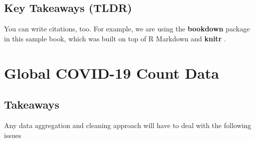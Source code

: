 \documentclass[
]{book}
\begin{document}
\hypertarget{key-takeaways-tldr}{%
\section{Key Takeaways (TLDR)}\label{key-takeaways-tldr}}

You can write citations, too. For example, we are using the \textbf{bookdown} package \citep{R-bookdown} in this sample book, which was built on top of R Markdown and \textbf{knitr} \citep{xie2015}.

\hypertarget{global-covid-19-count-data}{%
\chapter{Global COVID-19 Count Data}\label{global-covid-19-count-data}}

\hypertarget{takeaways}{%
\section{Takeaways}\label{takeaways}}

Any data aggregation and cleaning approach will have to deal with the following issues
\end{document}
